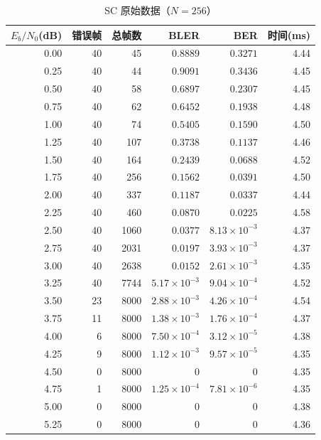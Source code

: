 \documentclass[12pt, a4paper]{article}
\begin{document}
\begin{table}[H]
\centering\caption{SC 原始数据（$N=256$）}\small
\begin{tabular}{rrrrrr}
\toprule
$E_b/N_0$(dB) & 错误帧 & 总帧数 & BLER & BER & 时间(ms) \\
\midrule
0.00 & 40 & 45 & $0.8889$ & $0.3271$ & 4.44 \\
0.25 & 40 & 44 & $0.9091$ & $0.3436$ & 4.45 \\
0.50 & 40 & 58 & $0.6897$ & $0.2307$ & 4.45 \\
0.75 & 40 & 62 & $0.6452$ & $0.1938$ & 4.48 \\
1.00 & 40 & 74 & $0.5405$ & $0.1590$ & 4.50 \\
1.25 & 40 & 107 & $0.3738$ & $0.1137$ & 4.46 \\
1.50 & 40 & 164 & $0.2439$ & $0.0688$ & 4.52 \\
1.75 & 40 & 256 & $0.1562$ & $0.0391$ & 4.50 \\
2.00 & 40 & 337 & $0.1187$ & $0.0337$ & 4.44 \\
2.25 & 40 & 460 & $0.0870$ & $0.0225$ & 4.58 \\
2.50 & 40 & 1060 & $0.0377$ & $8.13\times10^{-3}$ & 4.37 \\
2.75 & 40 & 2031 & $0.0197$ & $3.93\times10^{-3}$ & 4.37 \\
3.00 & 40 & 2638 & $0.0152$ & $2.61\times10^{-3}$ & 4.35 \\
3.25 & 40 & 7744 & $5.17\times10^{-3}$ & $9.04\times10^{-4}$ & 4.52 \\
3.50 & 23 & 8000 & $2.88\times10^{-3}$ & $4.26\times10^{-4}$ & 4.54 \\
3.75 & 11 & 8000 & $1.38\times10^{-3}$ & $1.76\times10^{-4}$ & 4.37 \\
4.00 & 6 & 8000 & $7.50\times10^{-4}$ & $3.12\times10^{-5}$ & 4.38 \\
4.25 & 9 & 8000 & $1.12\times10^{-3}$ & $9.57\times10^{-5}$ & 4.35 \\
4.50 & 0 & 8000 & $0$ & $0$ & 4.35 \\
4.75 & 1 & 8000 & $1.25\times10^{-4}$ & $7.81\times10^{-6}$ & 4.35 \\
5.00 & 0 & 8000 & $0$ & $0$ & 4.38 \\
5.25 & 0 & 8000 & $0$ & $0$ & 4.36 \\
\bottomrule
\end{tabular}
\end{table}
\end{document}
